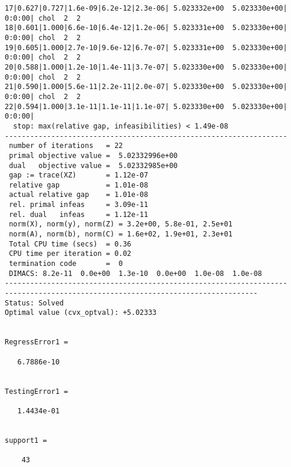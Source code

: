 \documentclass[11pt,a4paper]{report}
\begin{document}
\begin{verbatim}
17|0.627|0.727|1.6e-09|6.2e-12|2.3e-06| 5.023332e+00  5.023330e+00| 0:0:00| chol  2  2 
18|0.601|1.000|6.6e-10|6.4e-12|1.2e-06| 5.023331e+00  5.023330e+00| 0:0:00| chol  2  2 
19|0.605|1.000|2.7e-10|9.6e-12|6.7e-07| 5.023331e+00  5.023330e+00| 0:0:00| chol  2  2 
20|0.588|1.000|1.2e-10|1.4e-11|3.7e-07| 5.023330e+00  5.023330e+00| 0:0:00| chol  2  2 
21|0.590|1.000|5.6e-11|2.2e-11|2.0e-07| 5.023330e+00  5.023330e+00| 0:0:00| chol  2  2 
22|0.594|1.000|3.1e-11|1.1e-11|1.1e-07| 5.023330e+00  5.023330e+00| 0:0:00|
  stop: max(relative gap, infeasibilities) < 1.49e-08
-------------------------------------------------------------------
 number of iterations   = 22
 primal objective value =  5.02332996e+00
 dual   objective value =  5.02332985e+00
 gap := trace(XZ)       = 1.12e-07
 relative gap           = 1.01e-08
 actual relative gap    = 1.01e-08
 rel. primal infeas     = 3.09e-11
 rel. dual   infeas     = 1.12e-11
 norm(X), norm(y), norm(Z) = 3.2e+00, 5.8e-01, 2.5e+01
 norm(A), norm(b), norm(C) = 1.6e+02, 1.9e+01, 2.3e+01
 Total CPU time (secs)  = 0.36  
 CPU time per iteration = 0.02  
 termination code       =  0
 DIMACS: 8.2e-11  0.0e+00  1.3e-10  0.0e+00  1.0e-08  1.0e-08
-------------------------------------------------------------------
------------------------------------------------------------
Status: Solved
Optimal value (cvx_optval): +5.02333
 

RegressError1 =

   6.7886e-10


TestingError1 =

   1.4434e-01


support1 =

    43


\end{verbatim}
\end{document}
